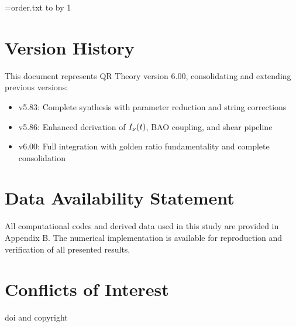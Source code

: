 \documentclass[11pt,a4paper,twoside]{article}
\newcommand{\loadchapters}[1]{%
  \chapterindex=0\relax
  \newread\orderfile
  \openin\orderfile=#1
  \loop\unless\ifeof\orderfile
    \read\orderfile to \chapterline
    \unless\ifx\chapterline\empty
      \advance\chapterindex by 1
      \ifnum\chapterindex=11 \appendix\fi
      
    \fi
  \repeat
  \closein\orderfile
}
\begin{document}
\cleardoublepage
\tableofcontents
\cleardoublepage
\listoffigures
\cleardoublepage
\listoftables
\cleardoublepage


\loadchapters{order.txt}

\clearpage
\printbibliography

\section*{Version History}
This document represents QR Theory version 6.00, consolidating and extending previous versions:
\begin{itemize}
  \item v5.83: Complete synthesis with parameter reduction and string corrections
  \item v5.86: Enhanced derivation of $I_\nu(t)$, BAO coupling, and shear pipeline
  \item v6.00: Full integration with golden ratio fundamentality and complete consolidation
\end{itemize}

\section*{Data Availability Statement}
All computational codes and derived data used in this study are provided in Appendix B. The numerical implementation is available for reproduction and verification of all presented results.

\section*{Conflicts of Interest}
doi and copyright
\end{document}
